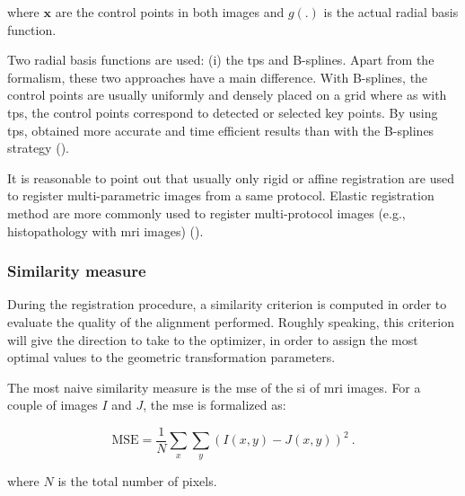 \noindent where $\mathbf{x}$ are the control points in both images and $g(.)$ is the actual radial basis function. 

Two radial basis functions are used: (i) the \ac{tps} and B-splines. Apart from the formalism, these two approaches have a main difference. With B-splines, the control points are usually uniformly and densely placed on a grid where as with \ac{tps}, the control points correspond to detected or selected key points. By using \ac{tps}, \cite{Mitra2011} obtained more accurate and time efficient results than with the B-splines strategy (\cite{Mitra2012a}). %

It is reasonable to point out that usually only rigid or affine registration are used to register multi-parametric images from a same protocol. Elastic registration method are more commonly used to register multi-protocol images (e.g., histopathology with \ac{mri} images) (\cite{Toth2008,Toth2009}).

\subsubsection{Similarity measure}\label{subsubsec:simmea}

During the registration procedure, a similarity criterion is computed in order to evaluate the quality of the alignment performed. Roughly speaking, this criterion will give the direction to take to the optimizer, in order to assign the most optimal values to the geometric transformation parameters.

The most naive similarity measure is the \ac{mse} of the \ac{si} of \ac{mri} images. For a couple of images $I$ and $J$, the \ac{mse} is formalized as:

\begin{equation}
	\text{MSE} =\frac{1}{N} \sum_x \sum_y ( I(x,y) - J(x,y) )^2 \ .
	\label{eq:mse}
\end{equation}

\noindent where $N$ is the total number of pixels.

